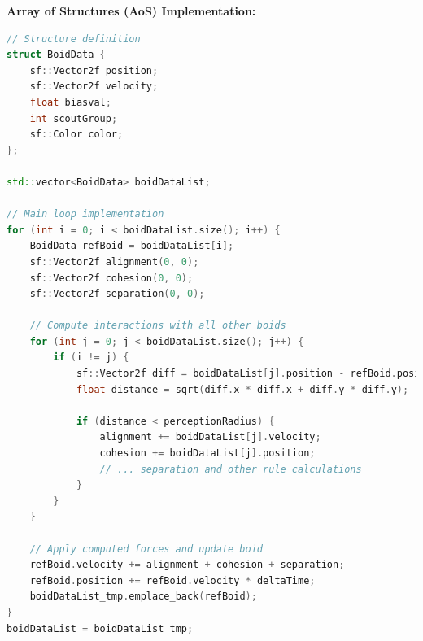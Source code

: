 \documentclass[10pt,twocolumn,letterpaper]{article}
\begin{document}
\textbf{Array of Structures (AoS) Implementation:}
\begin{lstlisting}[language=C++, caption=AoS data structure and main loop]
// Structure definition
struct BoidData {
    sf::Vector2f position;
    sf::Vector2f velocity;
    float biasval;
    int scoutGroup;
    sf::Color color;
};

std::vector<BoidData> boidDataList;

// Main loop implementation
for (int i = 0; i < boidDataList.size(); i++) {
    BoidData refBoid = boidDataList[i];
    sf::Vector2f alignment(0, 0);
    sf::Vector2f cohesion(0, 0);
    sf::Vector2f separation(0, 0);
    
    // Compute interactions with all other boids
    for (int j = 0; j < boidDataList.size(); j++) {
        if (i != j) {
            sf::Vector2f diff = boidDataList[j].position - refBoid.position;
            float distance = sqrt(diff.x * diff.x + diff.y * diff.y);
            
            if (distance < perceptionRadius) {
                alignment += boidDataList[j].velocity;
                cohesion += boidDataList[j].position;
                // ... separation and other rule calculations
            }
        }
    }
    
    // Apply computed forces and update boid
    refBoid.velocity += alignment + cohesion + separation;
    refBoid.position += refBoid.velocity * deltaTime;
    boidDataList_tmp.emplace_back(refBoid);
}
boidDataList = boidDataList_tmp;
\end{lstlisting}
\end{document}
